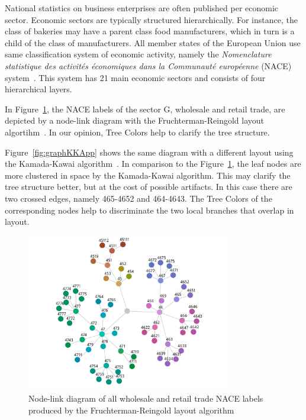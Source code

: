 \documentclass[journal]{vgtc}                %
\begin{document}
National statistics on business enterprises are often published per economic sector. Economic sectors are typically structured hierarchically. For instance, the class of bakeries may have a parent class food manufacturers, which in turn is a child of the class of manufacturers. All member states of the European Union use same classification system of economic activity, namely the \textit{Nomenclature statistique des activit\'es \'economiques dans la Communaut\'e europ\'eenne} (NACE) system~\cite{nace}. This system has 21 main economic sectors and consists of four hierarchical layers.

In Figure~\ref{fig:graphFRApp}, the NACE labels of the sector G, wholesale and retail trade, are depicted by a node-link diagram with the Fruchterman-Reingold layout algortihm~\cite{Fruchterman91}. In our opinion, Tree Colors help to clarify the tree structure.


Figure~\ref{fig:graphKKApp} shows the same diagram with a different layout using the Kamada-Kawai algorithm~\cite{Kamada89}. In comparison to the Figure~\ref{fig:graphFRApp}, the leaf nodes are more clustered in space by the Kamada-Kawai algorithm. This may clarify the tree structure better, but at the cost of possible artifacts. In this case there are two crossed edges, namely 465-4652 and 464-4643. The Tree Colors of the corresponding nodes help to discriminate the two local branches that overlap in layout.

\begin{figure}[t]
  \centering
  \includegraphics[width=3.5in]{Gbusiness_FR.pdf}
  \caption{Node-link diagram of all wholesale and retail trade NACE labels produced by the Fruchterman-Reingold layout algorithm}\label{fig:graphFRApp}
\end{figure}
\end{document}
